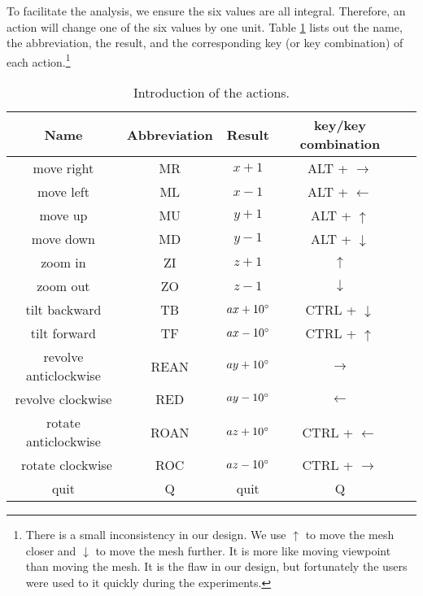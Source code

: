 To facilitate the analysis, we ensure the six values are all integral. 
Therefore, an action will change one of the six values by one unit.
Table \ref{t:user:action} lists out the name, the abbreviation, the result,
and the corresponding key (or key combination) of each action.\footnote{
There is a small inconsistency in our design. 
We use $\uparrow$ to move the mesh closer and $\downarrow$ to move the mesh
further. It is more like moving viewpoint than moving the mesh. 
It is the flaw in our design, but fortunately the users were used to it quickly
during the experiments.}

\begin{table}
    \centering
    \begin{tabular}{|c|c|c|c|c|}
        \hline
        Name & Abbreviation & Result & key/key combination \\
        \hline
        move right & MR     & $x + 1$  & ALT + $\rightarrow$\\
        move left  & ML     & $x - 1$  & ALT + $\leftarrow$\\
        move up    & MU     & $y + 1$  & ALT + $\uparrow$\\
        move down  & MD     & $y - 1$  & ALT + $\downarrow$\\
        zoom in    & ZI     & $z + 1$  & $\uparrow$\\
        zoom out   & ZO     & $z - 1$  & $\downarrow$\\
        tilt backward & TB  & $ax + 10^\circ$ & CTRL + $\downarrow$\\
        tilt forward & TF   & $ax - 10^\circ$ & CTRL + $\uparrow$\\
        revolve anticlockwise & REAN & $ay + 10^\circ$ & $\rightarrow$\\
        revolve clockwise & RED & $ay - 10^\circ$ & $\leftarrow$\\
        rotate  anticlockwise & ROAN & $az + 10^\circ$ & CTRL + $\leftarrow$\\\
        rotate  clockwise & ROC &  $az - 10^\circ$ & CTRL + $\rightarrow$\\
        quit       & Q      & quit     & Q \\
        \hline
    \end{tabular}
    \caption{Introduction of the actions.}\label{t:user:action}
\end{table}


